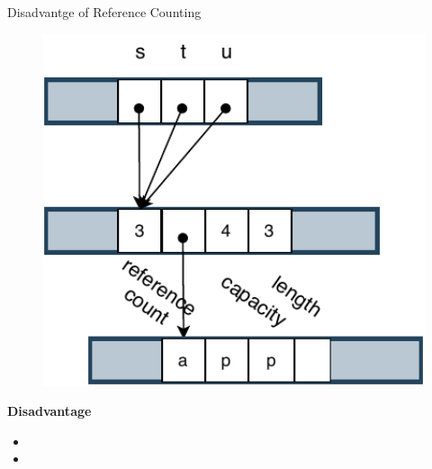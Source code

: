 \documentclass[9pt]{beamer}
\begin{document}
\begin{frame}[fragile]{Disadvantge of Reference Counting}
\begin{minipage}{0.3\linewidth}
\begin{figure}[hp]
        \end{figure}
    \end{minipage}
    \begin{minipage}{0.3\linewidth}
        \begin{figure}[hp]
            \centering
            \begin{center}
                    \includegraphics[width=1.0\textwidth]{images/rc3.pdf}
                    \captionsetup{labelformat=empty}
            \end{center}
            
        \end{figure}
    \end{minipage}
    \vspace{0.5cm}

    \textbf{Disadvantage}
    \begin{itemize}
        \item {} 
        \item {}
    \end{itemize}


\end{frame}


\end{document}
